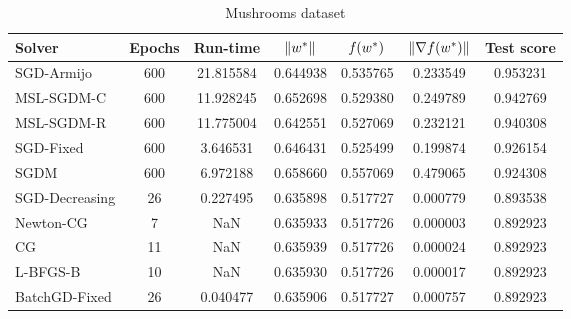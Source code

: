 \begin{table}
\caption{Mushrooms dataset}
\label{tab:mush-tab}
\centering
\begin{tabular}{lS[drop-zero-decimal]S[round-precision=4]S[round-precision=6]S[round-precision=6]S[exponent-mode=scientific]S[round-precision=6]}
\toprule
Solver & {Epochs} & {Run-time} & {$\lVert w^\ast\rVert$} & {$\operatorname*{\mathit{f}}(w^\ast)$} & {$\lVert\nabla f(w^\ast)\rVert$} & {Test score} \\
\midrule
SGD-Armijo & 600 & 21.815584 & 0.644938 & 0.535765 & 0.233549 & 0.953231 \\
MSL-SGDM-C & 600 & 11.928245 & 0.652698 & 0.529380 & 0.249789 & 0.942769 \\
MSL-SGDM-R & 600 & 11.775004 & 0.642551 & 0.527069 & 0.232121 & 0.940308 \\
SGD-Fixed & 600 & 3.646531 & 0.646431 & 0.525499 & 0.199874 & 0.926154 \\
SGDM & 600 & 6.972188 & 0.658660 & 0.557069 & 0.479065 & 0.924308 \\
SGD-Decreasing & 26 & 0.227495 & 0.635898 & 0.517727 & 0.000779 & 0.893538 \\
Newton-CG & 7 & NaN & 0.635933 & 0.517726 & 0.000003 & 0.892923 \\
CG & 11 & NaN & 0.635939 & 0.517726 & 0.000024 & 0.892923 \\
L-BFGS-B & 10 & NaN & 0.635930 & 0.517726 & 0.000017 & 0.892923 \\
BatchGD-Fixed & 26 & 0.040477 & 0.635906 & 0.517727 & 0.000757 & 0.892923 \\
\bottomrule
\end{tabular}
\end{table}

